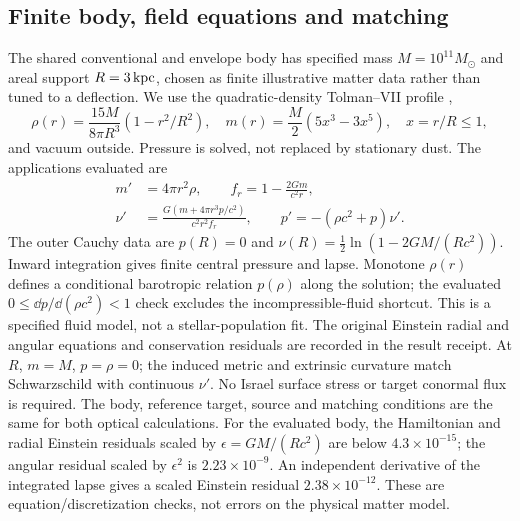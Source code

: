 \subsection{Finite body, field equations and matching}
The shared conventional and envelope body has specified mass
$M=10^{11}M_\odot$ and areal support $R=3\,{\rm kpc}$, chosen as finite
illustrative matter data rather than tuned to a deflection. We use the
quadratic-density Tolman--VII profile \citep{Tolman1939},
\begin{equation}
 \rho(r)=\frac{15M}{8\pi R^3}(1-r^2/R^2),\quad
 m(r)=\frac M2(5x^3-3x^5),\quad x=r/R\leq1,
 \label{eq:sl-finite-matter}
\end{equation}
and vacuum outside. Pressure is solved, not replaced by stationary dust.
The applications evaluated are
\begin{align}
 m'&=4\pi r^2\rho,\qquad f_r=1-\frac{2Gm}{c^2r},\\
 \nu'&=\frac{G(m+4\pi r^3p/c^2)}{c^2r^2f_r},\qquad
 p'=-(\rho c^2+p)\nu'.
 \label{eq:sl-tov}
\end{align}
The outer Cauchy data are $p(R)=0$ and
$\nu(R)=\tfrac12\ln(1-2GM/(Rc^2))$. Inward integration gives finite
central pressure and lapse. Monotone $\rho(r)$ defines a conditional
barotropic relation $p(\rho)$ along the solution; the evaluated
$0\leq\dd p/\dd(\rho c^2)<1$ check excludes the incompressible-fluid
shortcut. This is a specified fluid model, not a stellar-population fit.
The original Einstein radial and angular equations and conservation
residuals are recorded in the result receipt. At $R$, $m=M$, $p=\rho=0$;
the induced metric and extrinsic curvature match Schwarzschild with
continuous $\nu'$. No Israel surface stress or target conormal flux is
required. The body, reference target, source and matching conditions are
the same for both optical calculations.
For the evaluated body, the Hamiltonian and radial Einstein residuals
scaled by $\epsilon=GM/(Rc^2)$ are below $4.3\times10^{-15}$;
the angular residual scaled by $\epsilon^2$ is $2.23\times10^{-9}$.
An independent derivative of the integrated lapse gives a scaled
Einstein residual $2.38\times10^{-12}$. These are equation/discretization
checks, not errors on the physical matter model.

